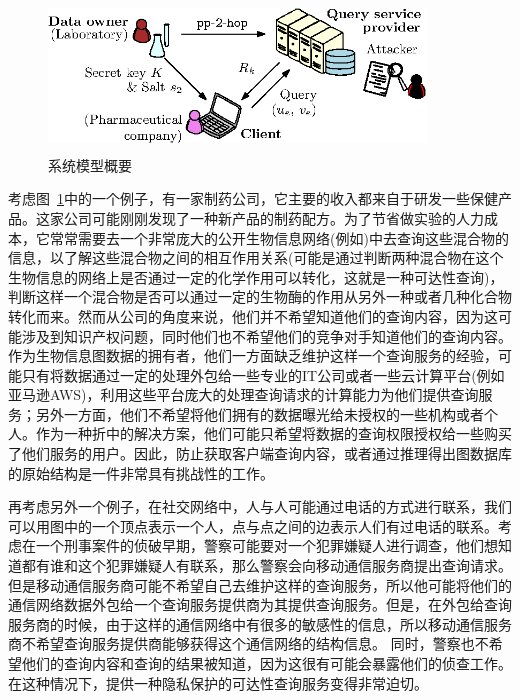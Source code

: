 \begin{figure}
\centering
\includegraphics[height=4cm ,width=10cm]{example/system.eps}
\caption{系统模型概要}
\label{fig:overview}
\end{figure}


考虑图~\ref{fig:overview}中的一个例子，有一家制药公司，它主要的收入都来自于研发一些保健产品。这家公司可能刚刚发现了一种新产品的制药配方。为了节省做实验的人力成本，它常常需要去一个非常庞大的公开生物信息网络(例如\cite{biology})中去查询这些混合物的信息，以了解这些混合物之间的相互作用关系(可能是通过判断两种混合物在这个生物信息的网络上是否通过一定的化学作用可以转化，这就是一种可达性查询)，判断这样一个混合物是否可以通过一定的生物酶的作用从另外一种或者几种化合物转化而来。然而从公司的角度来说，他们并不希望\SP 知道他们的查询内容，因为这可能涉及到知识产权问题，同时他们也不希望他们的竞争对手知道他们的查询内容。作为生物信息图数据的拥有者，他们一方面缺乏维护这样一个查询服务的经验，可能只有将数据通过一定的处理外包给一些专业的IT公司\cite{commercial}或者一些云计算平台(例如亚马逊AWS)，利用这些平台庞大的处理查询请求的计算能力为他们提供查询服务；另外一方面，他们不希望将他们拥有的数据曝光给未授权的一些机构或者个人。作为一种折中的解决方案，他们可能只希望将数据的查询权限授权给一些购买了他们服务的用户。因此，防止\SP 获取客户端查询内容，或者通过推理得出图数据库的原始结构是一件非常具有挑战性的工作。

再考虑另外一个例子，在社交网络中，人与人可能通过电话的方式进行联系，我们可以用图中的一个顶点表示一个人，点与点之间的边表示人们有过电话的联系。考虑在一个刑事案件的侦破早期，警察可能要对一个犯罪嫌疑人进行调查，他们想知道都有谁和这个犯罪嫌疑人有联系，那么警察会向移动通信服务商提出查询请求。但是移动通信服务商可能不希望自己去维护这样的查询服务，所以他可能将他们的通信网络数据外包给一个查询服务提供商\SP 为其提供查询服务。但是，在外包给查询服务商的时候，由于这样的通信网络中有很多的敏感性的信息，所以移动通信服务商不希望查询服务提供商\SP 能够获得这个通信网络的结构信息。 同时，警察也不希望他们的查询内容和查询的结果被\SP 知道，因为这很有可能会暴露他们的侦查工作。在这种情况下，提供一种隐私保护的可达性查询服务变得非常迫切。



